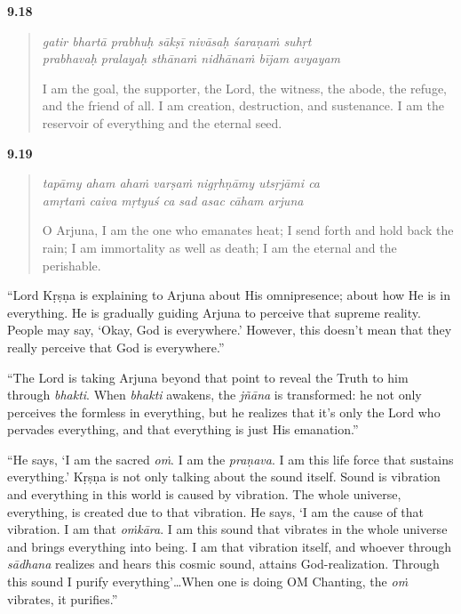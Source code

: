 \par\noindent\textbf{9.18}\par
\begin{verse}
\textit{gatir bhartā prabhuḥ sākṣī nivāsaḥ śaraṇaṁ suhṛt} \\
\textit{prabhavaḥ pralayaḥ sthānaṁ nidhānaṁ bījam avyayam}

\noindent I am the goal, the supporter, the Lord, the witness, the abode, the refuge, and the friend of all. I am creation, destruction, and sustenance. I am the reservoir of everything and the eternal seed.
\end{verse}
\par



\par\noindent\textbf{9.19}\par
\begin{verse}
\textit{tapāmy aham ahaṁ varṣaṁ nigṛhṇāmy utsṛjāmi ca} \\
\textit{amṛtaṁ caiva mṛtyuś ca sad asac cāham arjuna}

\noindent O Arjuna, I am the one who emanates heat; I send forth and hold back the rain; I am immortality as well as death; I am the eternal and the perishable.
\end{verse}
\par



\enquote{Lord Kṛṣṇa is explaining to Arjuna about His omnipresence; about how He is in everything. He is gradually guiding Arjuna to perceive that supreme reality. People may say, \enquote{Okay, God is everywhere.} However, this doesn’t mean that they really perceive that God is everywhere.}

\enquote{The Lord is taking Arjuna beyond that point to reveal the Truth to him through \textit{bhakti}. When \textit{bhakti} awakens, the \textit{jñāna} is transformed: he not only perceives the formless in everything, but he realizes that it’s only the Lord who pervades everything, and that everything is just His emanation.}

\enquote{He says, \enquote{I am the sacred \textit{oṁ}. I am the \textit{praṇava}. I am this life force that sustains everything.} Kṛṣṇa is not only talking about the sound itself. Sound is vibration and everything in this world is caused by vibration. The whole universe, everything, is created due to that vibration. He says, \enquote{I am the cause of that vibration. I am that \textit{oṁkāra}. I am this sound that vibrates in the whole universe and brings everything into being. I am that vibration itself, and whoever through \textit{sādhana} realizes and hears this cosmic sound, attains God-realization. Through this sound I purify everything}\ldots When one is doing OM Chanting, the \textit{oṁ} vibrates, it purifies.}

